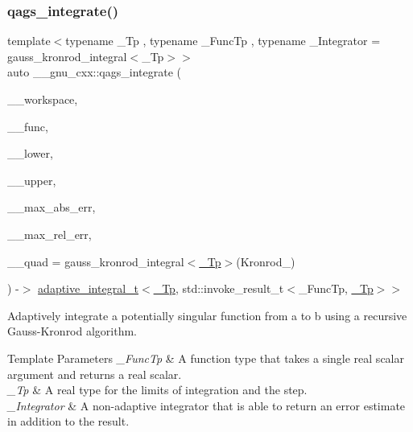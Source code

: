 \subsubsection{\texorpdfstring{qags\+\_\+integrate()}{qags\_integrate()}}
{\footnotesize\ttfamily template$<$typename \+\_\+\+Tp , typename \+\_\+\+Func\+Tp , typename \+\_\+\+Integrator  = gauss\+\_\+kronrod\+\_\+integral$<$\+\_\+\+Tp$>$$>$ \\
auto \+\_\+\+\_\+gnu\+\_\+cxx\+::qags\+\_\+integrate (\begin{DoxyParamCaption}\item[{\hyperlink{class____gnu__cxx_1_1integration__workspace}{integration\+\_\+workspace}$<$ \hyperlink{namespace____gnu__cxx_a3b19a9c800ca194374ef9172290f7d79}{\+\_\+\+Tp}, std\+::invoke\+\_\+result\+\_\+t$<$ \+\_\+\+Func\+Tp, \hyperlink{namespace____gnu__cxx_a3b19a9c800ca194374ef9172290f7d79}{\+\_\+\+Tp} $>$$>$ \&}]{\+\_\+\+\_\+workspace,  }\item[{\+\_\+\+Func\+Tp}]{\+\_\+\+\_\+func,  }\item[{\hyperlink{namespace____gnu__cxx_a3b19a9c800ca194374ef9172290f7d79}{\+\_\+\+Tp}}]{\+\_\+\+\_\+lower,  }\item[{\hyperlink{namespace____gnu__cxx_a3b19a9c800ca194374ef9172290f7d79}{\+\_\+\+Tp}}]{\+\_\+\+\_\+upper,  }\item[{\hyperlink{namespace____gnu__cxx_a3b19a9c800ca194374ef9172290f7d79}{\+\_\+\+Tp}}]{\+\_\+\+\_\+max\+\_\+abs\+\_\+err,  }\item[{\hyperlink{namespace____gnu__cxx_a3b19a9c800ca194374ef9172290f7d79}{\+\_\+\+Tp}}]{\+\_\+\+\_\+max\+\_\+rel\+\_\+err,  }\item[{\+\_\+\+Integrator}]{\+\_\+\+\_\+quad = {\ttfamily gauss\+\_\+kronrod\+\_\+integral$<$\hyperlink{namespace____gnu__cxx_a3b19a9c800ca194374ef9172290f7d79}{\+\_\+\+Tp}$>$(Kronrod\+\_)} }\end{DoxyParamCaption}) -\/$>$ \hyperlink{struct____gnu__cxx_1_1adaptive__integral__t}{adaptive\+\_\+integral\+\_\+t}$<$\hyperlink{namespace____gnu__cxx_a3b19a9c800ca194374ef9172290f7d79}{\+\_\+\+Tp}, std\+::invoke\+\_\+result\+\_\+t$<$\+\_\+\+Func\+Tp, \hyperlink{namespace____gnu__cxx_a3b19a9c800ca194374ef9172290f7d79}{\+\_\+\+Tp}$>$$>$
    }

Adaptively integrate a potentially singular function from a to b using a recursive Gauss-\/\+Kronrod algorithm.


\begin{DoxyTemplParams}{Template Parameters}
{\em \+\_\+\+Func\+Tp} & A function type that takes a single real scalar argument and returns a real scalar. \\
\hline
{\em \+\_\+\+Tp} & A real type for the limits of integration and the step. \\
\hline
{\em \+\_\+\+Integrator} & A non-\/adaptive integrator that is able to return an error estimate in addition to the result.\\
\hline
\end{DoxyTemplParams}

